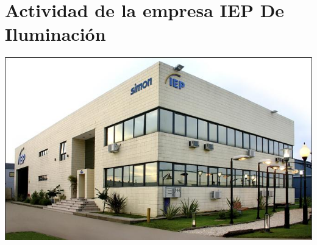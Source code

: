 \documentclass[12pt,titlepage]{report}
\begin{document}
\chapter{Actividad de la empresa IEP De Iluminación}

\begin{center}
 \includegraphics[scale=0.75]{./Images/iep-instalacion.png}
\end{center}



%

\end{document}
